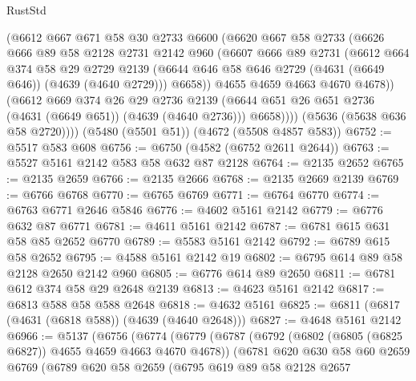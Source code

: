 \begin{lexlean}{RustStd}
\begin{coremodule}
{\begin{coremodule}
{{{{{{{{{{{{{{{{            (@6612
              @667
              @671
              @58
              @30
              @2733
              @6600
              (@6620
                @667
                @58
                @2733
                (@6626
                  @666
                  @89
                  @58
                  @2128
                  @2731
                  @2142
                  @960
                  (@6607
                    @666
                    @89
                    @2731
                    (@6612
                      @664
                      @374
                      @58
                      @29
                      @2729
                      @2139
                      (@6644 @646 @58 @646 @2729 (@4631 (@6649 @646)) (@4639 (@4640 @2729)))
                      @6658))
                  @4655
                  @4659
                  @4663
                  @4670
                  @4678))
              (@6612
                @669
                @374
                @26
                @29
                @2736
                @2139
                (@6644 @651 @26 @651 @2736 (@4631 (@6649 @651)) (@4639 (@4640 @2736)))
                @6658))))
        (@5636 (@5638 @636 @58 @2720))))
    (@5480 (@5501 @51))
    (@4672 (@5508 @4857 @583))
@6752 := @5517 @583 @608
@6756 := @6750 (@4582 (@6752 @2611 @2644))
@6763 := @5527 @5161 @2142 @583 @58 @632 @87 @2128
@6764 := @2135 @2652
@6765 := @2135 @2659
@6766 := @2135 @2666
@6768 := @2135 @2669 @2139
@6769 := @6766 @6768
@6770 := @6765 @6769
@6771 := @6764 @6770
@6774 := @6763 @6771 @2646 @5846
@6776 := @4602 @5161 @2142
@6779 := @6776 @632 @87 @6771
@6781 := @4611 @5161 @2142
@6787 := @6781 @615 @631 @58 @85 @2652 @6770
@6789 := @5583 @5161 @2142
@6792 := @6789 @615 @58 @2652
@6795 := @4588 @5161 @2142 @19
@6802 := @6795 @614 @89 @58 @2128 @2650 @2142 @960
@6805 := @6776 @614 @89 @2650
@6811 := @6781 @612 @374 @58 @29 @2648 @2139
@6813 := @4623 @5161 @2142
@6817 := @6813 @588 @58 @588 @2648
@6818 := @4632 @5161
@6825 := @6811 (@6817 (@4631 (@6818 @588)) (@4639 (@4640 @2648)))
@6827 := @4648 @5161 @2142
@6966 := @5137
    (@6756
      (@6774
        (@6779
          (@6787
            (@6792 (@6802 (@6805 (@6825 @6827)) @4655 @4659 @4663 @4670 @4678))
            (@6781
              @620
              @630
              @58
              @60
              @2659
              @6769
              (@6789
                @620
                @58
                @2659
                (@6795
                  @619
                  @89
                  @58
                  @2128
                  @2657
}}}}}}}}}}}}}}}}
\end{coremodule}}
\end{coremodule}
\end{lexlean}
